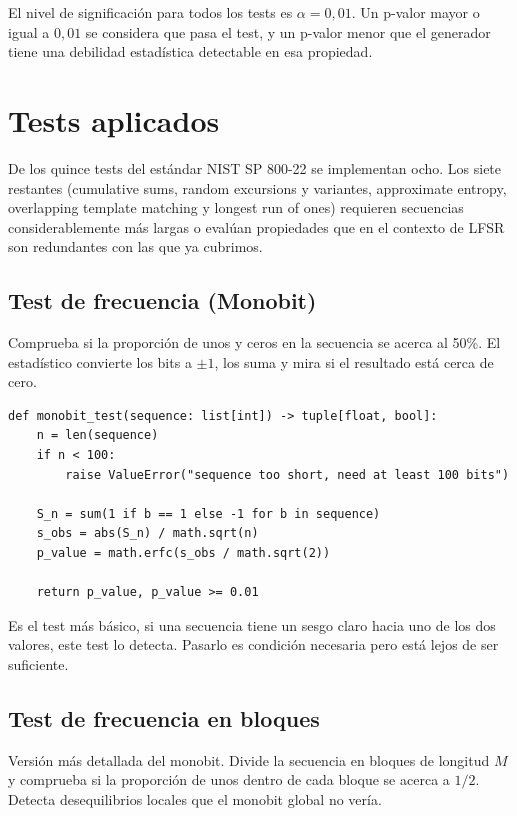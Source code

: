 El nivel de significación para todos los tests es $\alpha = 0{,}01$. Un p-valor mayor o igual a $0{,}01$ se considera que pasa el test,
y un p-valor menor que el generador tiene una debilidad estadística detectable en esa propiedad.

\section{Tests aplicados}

De los quince tests del estándar NIST SP 800-22 se implementan ocho.
Los siete restantes (cumulative sums, random excursions y variantes, approximate entropy,
overlapping template matching y longest run of ones) requieren secuencias considerablemente más largas
o evalúan propiedades que en el contexto de LFSR son redundantes con las que ya cubrimos.

\subsection{Test de frecuencia (Monobit)}

Comprueba si la proporción de unos y ceros en la secuencia se acerca al 50\%.
El estadístico convierte los bits a $\pm 1$, los suma y mira si el resultado está cerca de cero.

\begin{lstlisting}[style=Python,caption={Test Monobit (\texttt{src/tests\_nist/monobit.py}).}]
def monobit_test(sequence: list[int]) -> tuple[float, bool]:
    n = len(sequence)
    if n < 100:
        raise ValueError("sequence too short, need at least 100 bits")

    S_n = sum(1 if b == 1 else -1 for b in sequence)
    s_obs = abs(S_n) / math.sqrt(n)
    p_value = math.erfc(s_obs / math.sqrt(2))

    return p_value, p_value >= 0.01
\end{lstlisting}

Es el test más básico, si una secuencia tiene un sesgo claro hacia uno de los dos valores,
este test lo detecta. Pasarlo es condición necesaria pero está lejos de ser suficiente.

\subsection{Test de frecuencia en bloques}

Versión más detallada del monobit. Divide la secuencia en bloques de longitud $M$ y comprueba si la proporción de unos dentro de cada bloque se acerca a $1/2$.
Detecta desequilibrios locales que el monobit global no vería.

